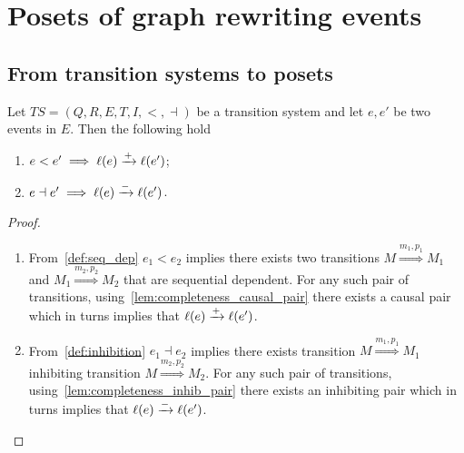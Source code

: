 \section{Posets of graph rewriting events}

\subsection{From transition systems to posets}

\begin{lemma}
  \label{lemma:pos_infl}
  Let $TS = (Q,R,E,T,I,<,\dashv)$ be a transition system and let $e,e'$ be two events in $E$. Then the following hold
  \begin{enumerate}
  \item $e<e'\implies \ell(e)\xrightarrow{+}\ell(e')$;
  \item $e\dashv e' \implies\ell(e)\xrightarrow{-}\ell(e')$.
  \end{enumerate}
\end{lemma}
\begin{proof}
  \begin{enumerate}
  \item From~\autoref{def:seq_dep} $e_1 < e_2$ implies there exists two transitions $M\overset{m_1,p_1}{\Rightarrow} M_1$ and $M_1\overset{m_2,p_2}{\Rightarrow} M_2$ that are sequential dependent. For any such pair of transitions, using~\autoref{lem:completeness_causal_pair} there exists a causal pair which in turns implies that $\ell(e)\xrightarrow{+}\ell(e')$.

  \item From~\autoref{def:inhibition} $e_1 \dashv e_2$ implies there exists transition $M\overset{m_1,p_1}{\Rightarrow} M_1$ inhibiting transition $M\overset{m_2,p_2}{\Rightarrow} M_2$. For any such pair of transitions, using~\autoref{lem:completeness_inhib_pair} there exists an inhibiting pair which in turns implies that $\ell(e)\xrightarrow{-}\ell(e')$.
  \end{enumerate}
\end{proof}


